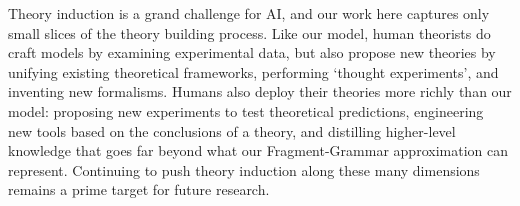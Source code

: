 \documentclass[12pt]{article}
\begin{document}
Theory induction is a grand challenge for AI,
and our work here
captures only small slices of
the theory building process.
Like our model, human theorists
do craft models
by examining experimental data,
but also propose new theories by
unifying existing theoretical frameworks,
performing `thought experiments',
and inventing new formalisms.
Humans also deploy their theories more richly than our model:
proposing new experiments to test theoretical predictions,
engineering new tools based on the conclusions of a theory,
and distilling higher-level knowledge that goes far beyond what our
Fragment-Grammar approximation can represent.
Continuing to push theory induction along these many dimensions 
remains a prime target for future research.















\end{document}
